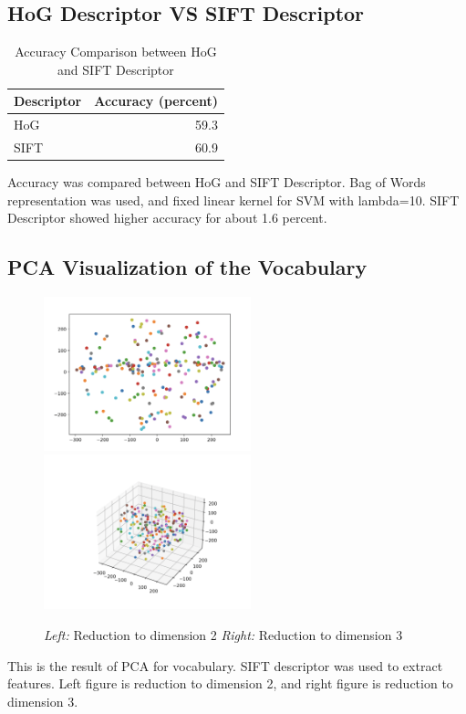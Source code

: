 \subsection*{HoG Descriptor VS SIFT Descriptor}
\begin{table}[h]
    \centering
    \begin{tabular}{lr}
        \toprule
        Descriptor & Accuracy (percent) \\
        \midrule
        HoG & 59.3 \\
        SIFT & 60.9 \\
        \bottomrule
    \end{tabular}
    \caption{Accuracy Comparison between HoG and SIFT Descriptor}
\end{table}
Accuracy was compared between HoG and SIFT Descriptor. Bag of Words representation was used, and fixed linear kernel for SVM with lambda=10.
SIFT Descriptor showed higher accuracy for about 1.6 percent.

\subsection*{PCA Visualization of the Vocabulary}

\begin{figure}[h]
    \centering
    \includegraphics[width=6cm]{../pca_dimension2.png}
    \includegraphics[width=6cm]{../pca_dimension3.png}
    \caption{\emph{Left:} Reduction to dimension 2 \emph{Right:} Reduction to dimension 3}
    \label{fig:result1}
\end{figure}
This is the result of PCA for vocabulary. SIFT descriptor was used to extract features. Left figure is reduction to dimension 2, and right figure is reduction to dimension 3.

